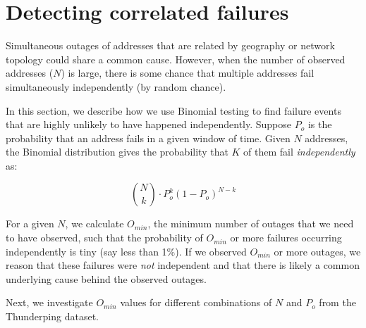 \section{Detecting correlated failures}
\label{sec:method}

Simultaneous outages of addresses that are related by geography or
network topology could share a common cause. However, when the number
of observed addresses ($N$) is large, there is some chance that
multiple addresses fail simultaneously independently (by random chance).

In this section, we describe how we use Binomial testing to find failure events that
are highly unlikely to have happened independently. Suppose $P_o$ is
the probability that an address fails in a given window of time. Given
$N$ addresses, the Binomial distribution gives the probability that
$K$ of them fail \emph{independently} as:

\[
{N\choose k} \cdot P_o^k(1-P_o)^{N-k}
\]

For a given $N$, we calculate $O_{min}$, the minimum number of
outages that we need to have observed, such that the probability of
$O_{min}$ or more failures occurring independently is tiny (say less
than 1\%). If we observed $O_{min}$ or more outages, we reason that these failures were \emph{not} independent
and that there is likely a common underlying cause behind the observed
outages.

Next, we investigate $O_{min}$ values for different combinations of
$N$ and $P_o$ from the Thunderping dataset.







